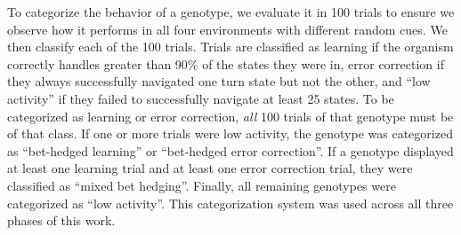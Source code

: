 To categorize the behavior of a genotype, we evaluate it in 100 trials to ensure we observe how it performs in all four environments with different random cues.
We then classify each of the 100 trials.
Trials are classified as learning if the organism correctly handles greater than 90\% of the states they were in, error correction if they always successfully navigated one turn state but not the other, and ``low activity'' if they failed to successfully navigate at least 25 states.
To be categorized as learning or error correction, \textit{all} 100 trials of that genotype must be of that class. 
If one or more trials were low activity, the genotype was categorized as ``bet-hedged learning'' or ``bet-hedged error correction''.
If a genotype displayed at least one learning trial and at least one error correction trial, they were classified as ``mixed bet hedging''.
Finally, all remaining genotypes were categorized as ``low activity''.
This categorization system was used across all three phases of this work.


